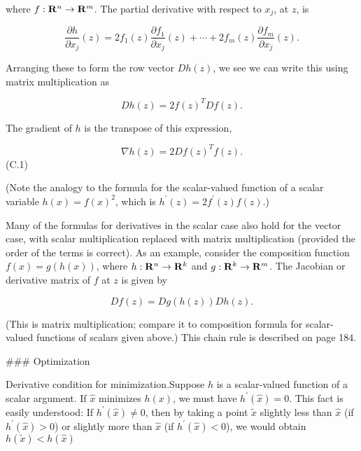 where \(f:{\bf R}^{n}\to{\bf R}^{m}\). The partial derivative with respect to \(x_{j}\), at \(z\), is

\[\frac{\partial h}{\partial x_{j}}(z)=2f_{1}(z)\frac{\partial f_{1}}{\partial x_ {j}}(z)+\cdots+2f_{m}(z)\frac{\partial f_{m}}{\partial x_{j}}(z).\]

Arranging these to form the row vector \(Dh(z)\), we see we can write this using matrix multiplication as

\[Dh(z)=2f(z)^{T}Df(z).\]

The gradient of \(h\) is the transpose of this expression,

\[\nabla h(z)=2Df(z)^{T}f(z).\] (C.1)

(Note the analogy to the formula for the scalar-valued function of a scalar variable \(h(x)=f(x)^{2}\), which is \(h^{\prime}(z)=2f^{\prime}(z)f(z)\).)

Many of the formulas for derivatives in the scalar case also hold for the vector case, with scalar multiplication replaced with matrix multiplication (provided the order of the terms is correct). As an example, consider the composition function \(f(x)=g(h(x))\), where \(h:{\bf R}^{n}\to{\bf R}^{k}\) and \(g:{\bf R}^{k}\to{\bf R}^{m}\). The Jacobian or derivative matrix of \(f\) at \(z\) is given by

\[Df(z)=Dg(h(z))Dh(z).\]

(This is matrix multiplication; compare it to composition formula for scalar-valued functions of scalars given above.) This chain rule is described on page 184.

### Optimization

Derivative condition for minimization.Suppose \(h\) is a scalar-valued function of a scalar argument. If \(\hat{x}\) minimizes \(h(x)\), we must have \(h^{\prime}(\hat{x})=0\). This fact is easily understood: If \(h^{\prime}(\hat{x})\neq 0\), then by taking a point \(\tilde{x}\) slightly less than \(\hat{x}\) (if \(h^{\prime}(\hat{x})>0\)) or slightly more than \(\hat{x}\) (if \(h^{\prime}(\hat{x})<0\)), we would obtain \(h(\tilde{x})<h(\hat{x})\) 